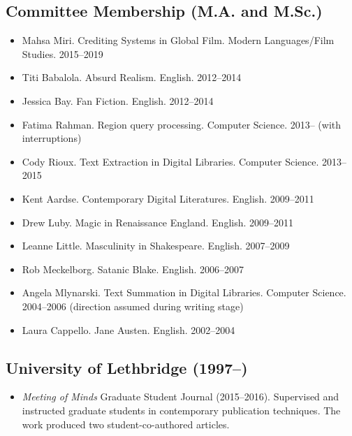 \documentclass[12pt]{article}
\begin{document}
\subsection*{Committee Membership (M.A. and M.Sc.)}

\begin{itemize}
  \item Mahsa Miri. Crediting Systems in Global Film. Modern Languages/Film Studies. 2015–2019
  \item Titi Babalola. Absurd Realism. English. 2012–2014
  \item Jessica Bay. Fan Fiction. English. 2012–2014
  \item Fatima Rahman. Region query processing. Computer Science. 2013– (with interruptions)
  \item Cody Rioux. Text Extraction in Digital Libraries. Computer Science. 2013–2015
  \item Kent Aardse. Contemporary Digital Literatures. English. 2009–2011
  \item Drew Luby. Magic in Renaissance England. English. 2009–2011
  \item Leanne Little. Masculinity in Shakespeare. English. 2007–2009
  \item Rob Meckelborg. Satanic Blake. English. 2006–2007
  \item Angela Mlynarski. Text Summation in Digital Libraries. Computer Science. 2004–2006 (direction assumed during writing stage)
  \item Laura Cappello. Jane Austen. English. 2002–2004
\end{itemize}



\subsection*{University of Lethbridge (1997–)}

\begin{itemize}
  \item\textit{Meeting of Minds} Graduate Student Journal (2015–2016). Supervised and instructed graduate students in contemporary publication techniques. The work produced two student-co-authored articles.
\end{itemize}
\end{document}
